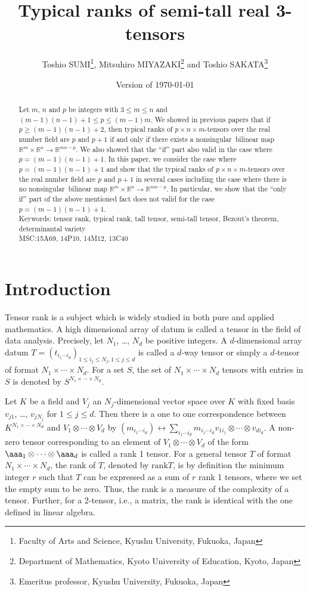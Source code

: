 \documentclass[a4paper,12pt]{article}
\title{%
Typical ranks of semi-tall real 3-tensors}
\author{%
Toshio SUMI\footnote{Faculty of Arts and Science, Kyushu University, Fukuoka, Japan},
Mitsuhiro MIYAZAKI\footnote{Department of  Mathematics, Kyoto University of Education, Kyoto, Japan}
and
Toshio SAKATA\footnote{Emeritus professor, Kyushu University, Fukuoka, Japan}}
\date{Version of \today}
\date{}
\newcommand{\RRR}{\mathbb{R}}
\newcommand{\rank}{\mathrm{rank}}
\newcommand\nonsing{nonsingular}
\begin{document}
\sloppy

\maketitle

\begin{abstract}
Let $m$, $n$ and $p$ be integers with $3\leq m\leq n$ and
$(m-1)(n-1)+1\leq p\leq (m-1)m$.
We showed in previous papers that if $p\geq (m-1)(n-1)+2$, then
typical ranks of $p\times n\times m$-tensors over the real number
field are $p$ and $p+1$ if and only if there exists a \nonsing\ 
bilinear map $\RRR^m\times \RRR^n\to\RRR^{mn-p}$.
We also showed that the ``if'' part also valid in the case where
$p=(m-1)(n-1)+1$.
In this paper, we consider the case where $p=(m-1)(n-1)+1$
and show that the typical ranks of $p\times n\times m$-tensors
over the real number field are $p$ and $p+1$ in several
cases including the case where there is no \nonsing\  bilinear
map $\RRR^m\times \RRR^n\to\RRR^{mn-p}$.
In particular, we show that the ``only if'' part of the above mentioned
fact does not valid for the case $p=(m-1)(n-1)+1$.
\\
Keywords:
tensor rank, typical rank, tall tensor, semi-tall tensor, Bezout's theorem, determinantal variety
\\
MSC:15A69, 14P10, 14M12, 13C40
\end{abstract}


\section{Introduction}

Tensor rank is a subject which is widely 
studied in both pure and applied mathematics.
A high dimensional array of datum is called a tensor in the field of
data analysis.
Precisely, let $N_1$, \ldots, $N_d$ be positive integers.
A $d$-dimensional array datum 
$T=(t_{i_1\cdots i_d})_{1\leq i_j\leq N_j, 1\leq j\leq d}$ is called a $d$-way tensor or
simply a $d$-tensor of format $N_1\times \cdots\times N_d$.
For a set $S$, the set of $N_1\times \cdots\times N_d$ tensors with entries in $S$
is denoted by $S^{N_1\times \cdots\times N_d}$.


Let $K$ be a field and $V_j$ an $N_j$-dimensional vector space over $K$ with fixed basis
$v_{j1}$, \ldots, $v_{jN_j}$ for $1\leq j\leq d$.
Then there is a one to one correspondence between $K^{N_1\times\cdots\times N_d}$
and $V_1\otimes\cdots\otimes V_d$ by
$(m_{i_1\cdots i_d})\leftrightarrow \sum_{i_1\cdots i_d}m_{i_1\cdots i_d}v_{1i_1}
\otimes\cdots\otimes v_{di_d}$.
A non-zero tensor corresponding to an element of 
$V_1\otimes \cdots\otimes V_d$ of the form $\aaa_1\otimes\cdots\otimes \aaa_d$
is called a rank 1 tensor.
For a general tensor $T$ of format $N_1\times\cdots\times N_d$, the rank of
$T$, denoted by $\rank T$, is by definition the minimum integer $r$
such that $T$ can be expressed as a sum of $r$ rank 1 tensors,
where we set the empty sum to be zero.
Thus, the rank is a measure of the complexity of a tensor.
Further, for a 2-tensor, i.e., a matrix, the rank is identical with the one
defined in linear algebra.
\end{document}
